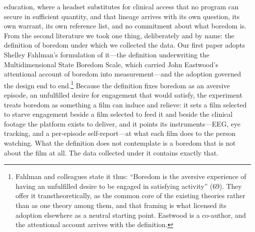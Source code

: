 education, where a headset substitutes for clinical access that no program can secure in
sufficient quantity, and that lineage arrives with its own question, its own warrant, its own
reference list, and no commitment about what boredom is. From the second literature we took
one thing, deliberately and by name: the definition of boredom under which we collected the
data. Our first paper adopts Shelley Fahlman's formulation of it---the definition
underwriting the Multidimensional State Boredom Scale, which carried John Eastwood's
attentional account of boredom into measurement---and the adoption governed the design end to
end.\footnote{Fahlman and colleagues state it thus: ``Boredom is the aversive experience of having an unfulfilled desire to be engaged in satisfying activity'' (69). They offer it
transtheoretically, as the common core of the existing theories rather than as one theory
among them, and that framing is what licensed its adoption elsewhere as a neutral starting
point. Eastwood is a co-author, and the attentional account arrives with the definition.} Because the definition fixes boredom as an aversive episode, an unfulfilled desire for
engagement that would satisfy, the experiment treats boredom as something a film can induce
and relieve: it sets a film selected to starve engagement beside a film selected to feed it
and beside the clinical footage the platform exists to deliver, and it points its
instruments---EEG, eye tracking, and a per-episode self-report---at what each film does to
the person watching. What the definition does not contemplate is a boredom that is not about
the film at all. The data collected under it contains exactly that.

\begin{center}
\end{center}

